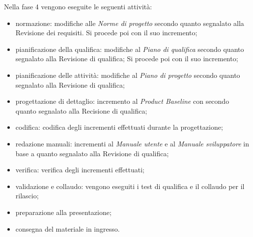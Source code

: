 Nella fase 4 vengono eseguite le seguenti attività:
\begin{itemize}
	\item normazione: modifiche alle \textit{Norme di progetto} secondo quanto segnalato alla Revisione dei requisiti. Si procede poi con il suo incremento;
	\item pianificazione della qualifica: modifiche al \textit{Piano di qualifica} secondo quanto segnalato alla Revisione di qualifica; Si procede poi con il suo incremento;
	\item pianificazione delle attività: modifiche al \textit{Piano di progetto} secondo quanto segnalato alla Revisione di qualifica;
	\item progettazione di dettaglio: incremento al \textit{Product Baseline} con secondo quanto segnalato alla Recisione di qualifica;
	\item codifica: codifica degli incrementi effettuati durante la progettazione;
	\item redazione manuali: incrementi al \textit{Manuale utente} e al \textit{Manuale sviluppatore} in base a quanto segnalato alla Revisione di qualifica;
	\item verifica: verifica degli incrementi effettuati;
	\item validazione e collaudo: vengono eseguiti i test di qualifica e il collaudo per il rilascio;
	\item preparazione alla presentazione;
	\item consegna del materiale in ingresso.
\end{itemize}
